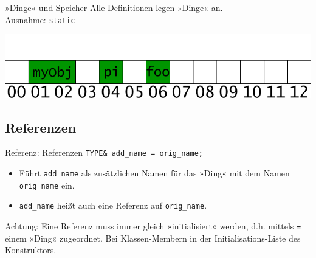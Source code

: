 \begin{frame}[fragile]{»Dinge« und Speicher}
	Alle Definitionen legen »Dinge« an.\\
	{\tiny Ausnahme: \verb|static|}
	
	{\footnotesize
	\begin{block}{}
		
	\end{block}
	}
	
	\pause
	\vspace{1em}
	
	\includegraphics[width=\linewidth]{images/object_things}
\end{frame}


\subsection{Referenzen}

\begin{frame}[fragile]{Referenz: Referenzen}
	\verb|TYPE& add_name = orig_name;|
	\begin{itemize}
		\item Führt \verb|add_name| als zusätzlichen Namen für das »Ding« mit dem Namen \verb|orig_name| ein.
		\item \verb|add_name| heißt auch eine Referenz auf \verb|orig_name|.
	\end{itemize}
	
	\vspace{2em}
	
	Achtung: Eine Referenz muss immer gleich »initialisiert« werden, d.h. mittels \verb|=| einem »Ding« zugeordnet. {\tiny Bei Klassen-Membern in der Initialisations-Liste des Konstruktors.}
\end{frame}

